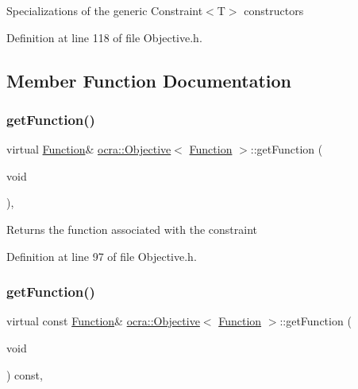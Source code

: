Specializations of the generic Constraint$<$\+T$>$ constructors 

Definition at line 118 of file Objective.\+h.



\subsection{Member Function Documentation}
\hypertarget{classocra_1_1Objective_3_01Function_01_4_add81891f4afd477c85ddc326a207e8be}{}\label{classocra_1_1Objective_3_01Function_01_4_add81891f4afd477c85ddc326a207e8be} 
\subsubsection{\texorpdfstring{get\+Function()}{getFunction()}\hspace{0.1cm}{\footnotesize\ttfamily [1/2]}}
{\footnotesize\ttfamily virtual \hyperlink{classocra_1_1Function}{Function}\& \hyperlink{classocra_1_1Objective}{ocra\+::\+Objective}$<$ \hyperlink{classocra_1_1Function}{Function} $>$\+::get\+Function (\begin{DoxyParamCaption}\item[{void}]{ }\end{DoxyParamCaption})\hspace{0.3cm}{\ttfamily [inline]}, {\ttfamily [virtual]}}

Returns the function associated with the constraint 

Definition at line 97 of file Objective.\+h.

\hypertarget{classocra_1_1Objective_3_01Function_01_4_a95077951a77304a73e345eb093513da0}{}\label{classocra_1_1Objective_3_01Function_01_4_a95077951a77304a73e345eb093513da0} 
\subsubsection{\texorpdfstring{get\+Function()}{getFunction()}\hspace{0.1cm}{\footnotesize\ttfamily [2/2]}}
{\footnotesize\ttfamily virtual const \hyperlink{classocra_1_1Function}{Function}\& \hyperlink{classocra_1_1Objective}{ocra\+::\+Objective}$<$ \hyperlink{classocra_1_1Function}{Function} $>$\+::get\+Function (\begin{DoxyParamCaption}\item[{void}]{ }\end{DoxyParamCaption}) const\hspace{0.3cm}{\ttfamily [inline]}, {\ttfamily [virtual]}}



